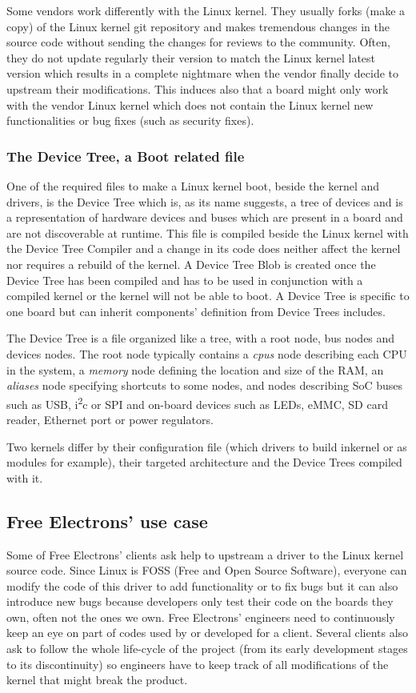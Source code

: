 Some vendors work differently with the Linux kernel. They usually forks (make a copy) of the Linux kernel git repository and makes tremendous changes in the source code without sending the changes for reviews to the community. Often, they do not update regularly their version to match the Linux kernel latest version which results in a complete nightmare when the vendor finally decide to upstream their modifications. This induces also that a board might only work with the vendor Linux kernel which does not contain the Linux kernel new functionalities or bug fixes (such as security fixes).

\subsubsection{The Device Tree, a Boot related file}

One of the required files to make a Linux kernel boot, beside the kernel and drivers, is the Device Tree which is, as its name suggests, a tree of devices and is a representation of hardware devices and buses which are present in a board and are not discoverable at runtime. This file is compiled beside the Linux kernel with the Device Tree Compiler and a change in its code does neither affect the kernel nor requires a rebuild of the kernel. A Device Tree Blob is created once the Device Tree has been compiled and has to be used in conjunction with a compiled kernel or the kernel will not be able to boot. A Device Tree is specific to one board but can inherit components' definition from Device Trees includes.

The Device Tree is a file organized like a tree, with a root node, bus nodes and devices nodes. The root node typically contains a \textit{cpus} node describing each CPU in the system, a \textit{memory} node defining the location and size of the RAM, an \textit{aliases} node specifying shortcuts to some nodes, and nodes describing SoC buses such as USB, i\textsuperscript{2}c or SPI and on-board devices such as LEDs, eMMC, SD card reader, Ethernet port or power regulators.

Two kernels differ by their configuration file (which drivers to build inkernel or as modules for example), their targeted architecture and the Device Trees compiled with it.

\subsection{Free Electrons' use case}
Some of Free Electrons' clients ask help to upstream a driver to the Linux kernel source code. Since Linux is FOSS (Free and Open Source Software), everyone can modify the code of this driver to add functionality or to fix bugs but it can also introduce new bugs because developers only test their code on the boards they own, often not the ones we own. Free Electrons' engineers need to continuously keep an eye on part of codes used by or developed for a client. Several clients also ask to follow the whole life-cycle of the project (from its early development stages to its discontinuity) so engineers have to keep track of all modifications of the kernel that might break the product.

